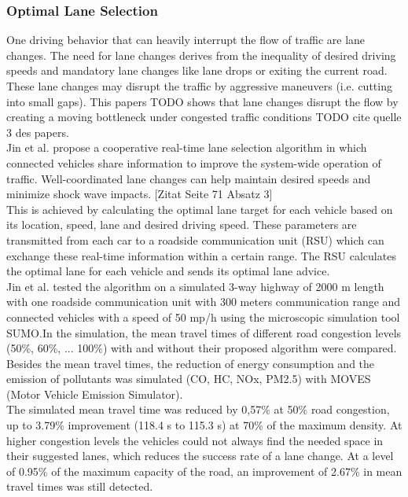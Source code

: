 \documentclass{sig-alternate}
\begin{document}
\subsubsection{Optimal Lane Selection}
\label{laneselection}
One driving behavior that can heavily interrupt the flow of traffic are lane changes. The need for lane changes derives from the inequality of desired driving speeds and mandatory lane changes like lane drops or exiting the current road. These lane changes may disrupt the traffic by aggressive maneuvers (i.e. cutting into small gaps). This papers TODO shows that lane changes disrupt the flow by creating a moving bottleneck under congested traffic conditions TODO cite quelle 3 des papers. \\
Jin et al.\cite{6856515} propose a cooperative real-time lane selection algorithm in which connected vehicles share information to improve the system-wide operation of traffic. Well-coordinated lane changes can help maintain desired speeds and minimize shock wave impacts.  [Zitat Seite 71 Absatz 3] \\
This is achieved by calculating the optimal lane target for each vehicle based on its location, speed, lane and desired driving speed. These parameters are transmitted from each car to a roadside communication unit (RSU) which can exchange these real-time information within a certain range. The RSU calculates the optimal lane for each vehicle and sends its optimal lane advice. \\
Jin et al.\cite{6856515} tested the algorithm on a simulated 3-way highway of 2000 m length with one roadside communication unit with 300 meters communication range and connected vehicles with a speed of 50 mp/h using the microscopic simulation tool SUMO\cite{sumo}.In the simulation, the mean travel times of different road congestion levels (50\%, 60\%, ... 100\%) with and without their proposed algorithm were compared. Besides the mean travel times, the reduction of energy consumption and the emission of pollutants was simulated (CO, HC, NOx, PM2.5) with MOVES\cite{simulator2010user} (Motor Vehicle Emission Simulator).\\
The simulated mean travel time was reduced by 0,57\% at 50\% road congestion, up to 3.79\% improvement (118.4 s to 115.3 s) at 70\% of the maximum density. At higher congestion levels the vehicles could not always find the needed space in their suggested lanes, which reduces the success rate of a lane change. At a level of 0.95\% of the maximum capacity of the road, an improvement of 2.67\% in mean travel times was still detected. \\
\end{document}
